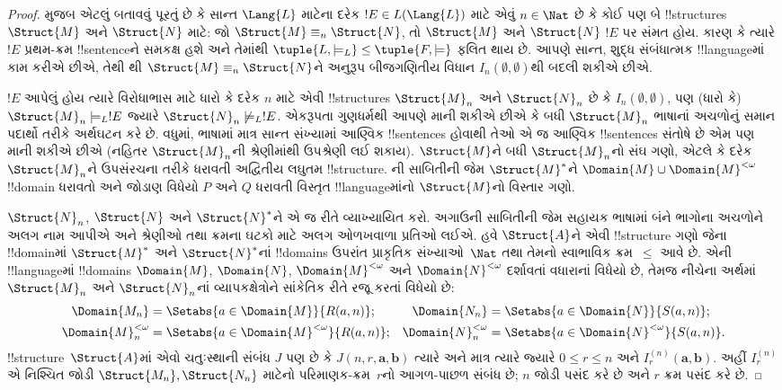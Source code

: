 \documentclass[../../../include/open-logic-section]{subfiles}
\begin{document}
\begin{proof}
 મુજબ એટલું બતાવવું પૂરતું છે કે સાન્ત
$\Lang{L}$ માટેના દરેક $!E \in L(\Lang{L})$ માટે એવું $n \in \Nat$
છે કે કોઈ પણ બે !!{structure}s $\Struct{M}$ અને $\Struct{N}$ માટે: જો
$\Struct{M} \equiv_n \Struct{N}$, તો $\Struct{M}$ અને $\Struct{N}$
$!E$ પર સંમત હોય. કારણ કે ત્યારે $!E$ પ્રથમ-ક્રમ !!{sentence}ને સમકક્ષ
હશે અને તેમાંથી $\tuple{L, \models_L} \le \tuple{F, \models}$
ફલિત થાય છે. આપણે સાન્ત, શુદ્ધ સંબંધાત્મક !!{language}માં કામ કરીએ
છીએ, તેથી થી $\Struct{M} \equiv_n
\Struct{N}$ને અનુરૂપ બીજગણિતીય વિધાન $I_n(\emptyset,\emptyset)$થી
બદલી શકીએ છીએ.

$!E$ આપેલું હોય ત્યારે વિરોધાભાસ માટે ધારો કે દરેક $n$ માટે એવી
!!{structure}s $\Struct{M}_n$ અને $\Struct{N}_n$ છે કે
$I_n(\emptyset, \emptyset)$, પણ (ધારો કે) $\Struct{M}_n \models_L !E$
જ્યારે $\Struct{N}_n \not\models_L !E$. એકરૂપતા ગુણધર્મથી આપણે માની
શકીએ છીએ કે બધી $\Struct{M}_n$ ભાષાનાં અચળોનું સમાન પદાર્થો તરીકે
અર્થઘટન કરે છે. વધુમાં, ભાષામાં માત્ર સાન્ત સંખ્યામાં આણ્વિક
!!{sentence}s હોવાથી તેઓ એ જ આણ્વિક !!{sentence}s સંતોષે છે એમ પણ
માની શકીએ છીએ (નહિતર $\Struct{M}_n$ની શ્રેણીમાંથી ઉપશ્રેણી લઈ શકાય).
$\Struct{M}$ને બધી $\Struct{M}_n$નો સંઘ ગણો, એટલે કે દરેક
$\Struct{M}_n$ને ઉપસંરચના તરીકે ધરાવતી અદ્વિતીય લઘુતમ !!{structure}.
ની સાબિતીની જેમ $\Struct{M}^*$ને
$\Domain{M} \cup \Domain{M}^{<\omega}$ !!{domain} ધરાવતો અને જોડાણ
વિધેયો $P$ અને $Q$ ધરાવતી વિસ્તૃત !!{language}માંનો
$\Struct{M}$નો વિસ્તાર ગણો.

$\Struct{N}_n$, $\Struct{N}$ અને $\Struct{N}^*$ને એ જ રીતે વ્યાખ્યાયિત
કરો. અગાઉની સાબિતીની જેમ સહાયક ભાષામાં બંને ભાગોના અચળોને અલગ નામ
આપીએ અને શ્રેણીઓ તથા ક્રમના ઘટકો માટે અલગ ઓળખવાળા પ્રતિઓ લઈએ.
હવે $\Struct{A}$ને એવી !!{structure} ગણો જેના !!{domain}માં
$\Struct{M}^*$ અને $\Struct{N}^*$નાં !!{domain}s ઉપરાંત પ્રાકૃતિક
સંખ્યાઓ~$\Nat$ તથા તેમનો સ્વાભાવિક ક્રમ~$\le$ આવે છે. એની
!!{language}માં !!{domain}s $\Domain{M}$, $\Domain{N}$,
$\Domain{M}^{<\omega}$ અને $\Domain{N}^{<\omega}$ દર્શાવતાં વધારાનાં
વિધેયો છે, તેમજ નીચેના અર્થમાં $\Struct{M}_n$ અને
$\Struct{N}_n$નાં વ્યાપકક્ષેત્રોને સાંકેતિક રીતે રજૂ કરતાં
વિધેયો છે:
\begin{align*}
  \Domain{M_n} & = \Setabs{a \in \Domain{M}}{R(a, n)}; &
  \Domain{N_n} & = \Setabs{a \in \Domain{N}}{S(a,n)}; \\
  \Domain{M}^{<\omega}_n & = \Setabs{a \in \Domain{M}^{<\omega}}{R(a,n)}; &
  \Domain{N}^{<\omega}_n & = \Setabs{a \in \Domain{N}^{<\omega}}{S(a,n)}.
\end{align*}
!!{structure}~$\Struct{A}$માં એવો ચતુઃસ્થાની સંબંધ $J$ પણ છે કે
$J(n,r,\mathbf{a},\mathbf{b})$ ત્યારે અને માત્ર ત્યારે જ્યારે
$0\le r\le n$ અને $I_r^{(n)}(\mathbf{a},\mathbf{b})$.
અહીં $I_r^{(n)}$ એ નિશ્ચિત જોડી $\Struct{M_n},\Struct{N_n}$ માટેનો
પરિમાણક-ક્રમ~$r$નો આગળ-પાછળ સંબંધ છે; $n$ જોડી પસંદ કરે છે અને $r$
ક્રમ પસંદ કરે છે.


\end{proof}
\end{document}
